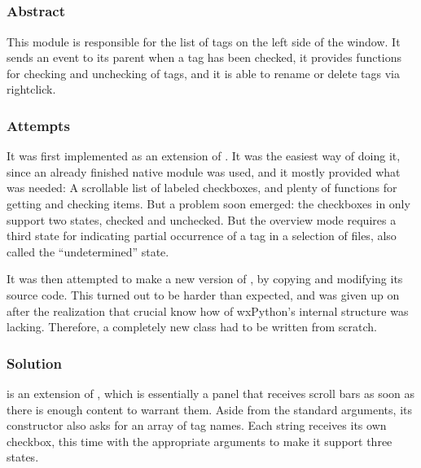 \subsection{}
\def\kapitelautor{Erik Ritschl}

\subsubsection{Abstract}

This module is responsible for the list of tags on the left side of the window.
It sends an event to its parent  when a tag has been
checked, it provides functions for checking and unchecking of tags, and it is
able to rename or delete tags via rightclick.

\subsubsection{Attempts}

It was first implemented as an extension of . It was
the easiest way of doing it, since an already finished native module was used,
and it mostly provided what was needed: A scrollable list of labeled
checkboxes, and plenty of functions for getting and checking items. But a
problem soon emerged: the checkboxes in  only support
two states, checked and unchecked. But the overview mode requires a third state
for indicating partial occurrence of a tag in a selection of files, also called
the ``undetermined'' state.

It was then attempted to make a new version of , by
copying and modifying its source code. This turned out to be harder than
expected, and was given up on after the realization that crucial know how of
wxPython's internal structure was lacking. Therefore, a
completely new class had to be written from scratch.

\subsubsection{Solution}

 is an extension of , which is
essentially a panel that receives scroll bars as soon as there is enough
content to warrant them. Aside from the standard arguments, its constructor
also asks for an array of tag names. Each string receives its own checkbox,
this time with the appropriate arguments to make it support three states.

